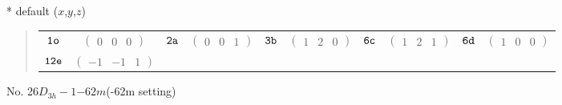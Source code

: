 \documentclass[fleqn,9pt,landscape]{jsarticle}
\begin{document}
* default ($x$,$y$,$z$)
\begin{quote}
\begin{tabular}{cccccccccc}
$ {\tt 1o} $ & $ \begin{pmatrix} 0 & 0 & 0 \end{pmatrix} $ & $ {\tt 2a} $ & $ \begin{pmatrix} 0 & 0 & 1 \end{pmatrix} $ & $ {\tt 3b} $ & $ \begin{pmatrix} 1 & 2 & 0 \end{pmatrix} $ & $ {\tt 6c} $ & $ \begin{pmatrix} 1 & 2 & 1 \end{pmatrix} $ & $ {\tt 6d} $ & $ \begin{pmatrix} 1 & 0 & 0 \end{pmatrix} $ \\
$ {\tt 12e} $ & $ \begin{pmatrix} -1 & -1 & 1 \end{pmatrix} $ & $  $ & $  $ & $  $ & $  $ & $  $ & $  $ & $  $ & $  $
\end{tabular}
\end{quote}
\newpage
No. 26\quad$D_{3h}-1$\quad$-62m$\quad(-62m setting)\quad[ hexagonal ]
\end{document}
